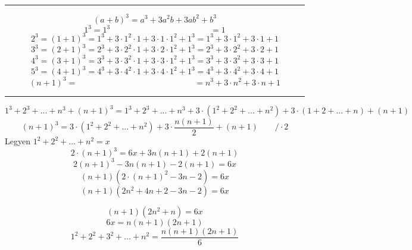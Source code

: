 \documentclass{article}
\begin{document}
\hrule

\[
(a + b)^3 = a^3 + 3a^2b + 3ab^2 + b^3
\]
\[
1^3 = 1^3\qquad\qquad\qquad\qquad\qquad\qquad = 1
\]
\[
2^3 = (1 + 1)^3 = 1^3 + 3 \cdot 1^2 \cdot 1 + 3 \cdot 1 \cdot 1^2 + 1^3 = 1^3 + 3 \cdot 1^2 + 3 \cdot 1 + 1
\]
\[
3^3 = (2 + 1)^3 = 2^3 + 3 \cdot 2^2 \cdot 1 + 3 \cdot 2 \cdot 1^2 + 1^3 = 2^3 + 3\cdot 2^2 + 3\cdot 2 + 1
\]
\[
4^3 = (3 + 1)^3 = 3^3 + 3 \cdot 3^2 \cdot 1 + 3\cdot3\cdot1^2 + 1^3 = 3^3 + 3 \cdot 3^2 + 3 \cdot 3 + 1
\]
\[
5^3 = (4 + 1)^3 = 4^3 + 3 \cdot 4^2 \cdot 1 + 3 \cdot 4 \cdot 1^2+ 1^3 = 4^3 + 3 \cdot 4^2 + 3\cdot 4 + 1
\]
\[
(n + 1)^3 = \qquad\qquad\qquad\qquad\qquad\qquad\qquad = n^3 + 3\cdot n^2 + 3\cdot n + 1
\]

\hrule

\[
1^3 + 2^3 + ... + n^3 + (n + 1)^3 = 1^3 + 2^3 + ... + n^3 + 3 \cdot(1^2 + 2^2 + ... + n^2) + 3 \cdot (1 + 2 + ... + n) + (n + 1)
\]
\[
(n + 1)^3 = 3 \cdot (1^2 + 2^2 + ... +  n^2) + 3\cdot \frac{n(n + 1)}{2} + (n + 1) \qquad /\cdot2
\]
Legyen $1^2 + 2^2 + ... + n^2 = x$
\[
2\cdot(n + 1)^3 = 6x + 3n(n+1) + 2(n + 1) 
\]
\[
2(n + 1)^3 - 3n(n+1) - 2(n + 1) = 6x 
\]
\[
(n + 1) ( 2 \cdot(n + 1)^2 - 3n - 2) = 6x
\]
\[
(n + 1) (2n^2 + 4n + 2 - 3n - 2) = 6x
\]

\[
(n + 1)(2n^2 + n) = 6x
\]
\[
6x = n(n+1)(2n+1)
\]
\[
1^2 + 2^2 + 3^2 + ... + n^2 = \frac{n(n + 1)(2n + 1)}{6}
\]

\end{document}
